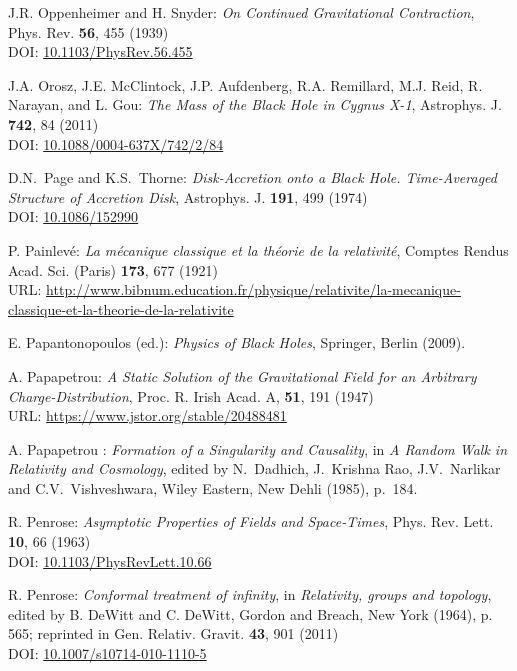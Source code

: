 \begin{thebibliography}{123}
J.R. Oppenheimer and H. Snyder:
{\em On Continued Gravitational Contraction},
Phys. Rev. {\bf 56}, 455 (1939)\\
DOI: \href{https://doi.org/10.1103/PhysRev.56.455}{10.1103/PhysRev.56.455}

J.A. Orosz, J.E. McClintock, J.P. Aufdenberg, R.A. Remillard, M.J. Reid, R. Narayan, and L. Gou:
{\em The Mass of the Black Hole in Cygnus X-1},
Astrophys. J. {\bf 742}, 84 (2011)\\
DOI: \href{https://doi.org/10.1088/0004-637X/742/2/84}{10.1088/0004-637X/742/2/84}

D.N.~Page and K.S.~Thorne: \emph{Disk-Accretion onto a Black Hole. Time-Averaged Structure of Accretion Disk},
Astrophys. J. {\bf 191}, 499 (1974)\\
DOI: \href{https://doi.org/10.1086/152990}{10.1086/152990}

P. Painlevé: \emph{La mécanique classique et la théorie de la relativité},
Comptes Rendus Acad. Sci. (Paris) {\bf 173}, 677 (1921)\\
URL: \url{http://www.bibnum.education.fr/physique/relativite/la-mecanique-classique-et-la-theorie-de-la-relativite}

E. Papantonopoulos (ed.): {\em Physics of Black Holes}, Springer, Berlin (2009).

A. Papapetrou:
{\em A Static Solution of the Gravitational Field for an Arbitrary Charge-Distribution},
Proc. R. Irish Acad. A, {\bf 51}, 191 (1947)\\
URL: \url{https://www.jstor.org/stable/20488481}

A. Papapetrou : {\em Formation of a Singularity and Causality},
in {\em A Random Walk in Relativity and Cosmology},
edited by N.~Dadhich, J.~Krishna Rao, J.V.~Narlikar and C.V.~Vishveshwara,
Wiley Eastern, New Dehli (1985), p.~184.

R. Penrose: {\em Asymptotic Properties of Fields and Space-Times},
Phys. Rev. Lett. {\bf 10}, 66 (1963)\\
DOI: \href{https://doi.org/10.1103/PhysRevLett.10.66}{10.1103/PhysRevLett.10.66}

R. Penrose: {\em Conformal treatment of infinity}, in {\em Relativity, groups and topology},
edited by B. DeWitt and C. DeWitt,
Gordon and Breach, New York (1964), p. 565; reprinted in
Gen. Relativ. Gravit. {\bf 43}, 901 (2011)\\
DOI: \href{https://doi.org/10.1007/s10714-010-1110-5}{10.1007/s10714-010-1110-5}


\end{thebibliography}
